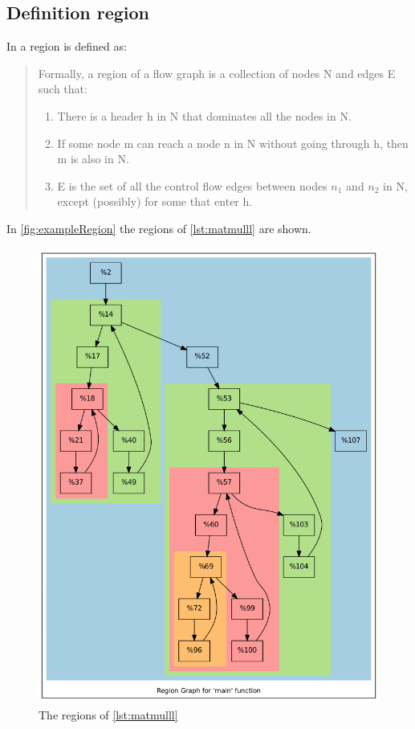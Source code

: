 \subsection{Definition region}\label{subsec:definitionRegion}
In \cite[chapter 9.7.1, p.~672]{Drachenbuch} a region is defined as:

\begin{quote}
    Formally, a region of a flow graph is a collection of nodes N and edges E such that:
    \begin{enumerate}
        \item There is a header h in N that dominates all the nodes in N.
        \item If some node m can reach a node n in N without going through h, then m is also in N.
        \item E is the set of all the control flow edges between nodes \(n_1\) and \(n_2\) in N, except (possibly) for some that enter h.
    \end{enumerate}
\end{quote}
In \autoref{fig:exampleRegion} the regions of \autoref{lst:matmulll} are shown.
\begin{figure}[!ht]
    \centering
    \caption{The regions of \autoref{lst:matmulll}}
    \label{fig:exampleRegion}
    \includegraphics[height=15cm]{gfx/matmulRegions.png}
\end{figure}\\
